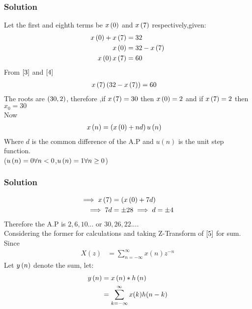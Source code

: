 \documentclass{beamer}
\begin{document}
\begin{frame}
\frametitle{Solution}
Let the first and eighth terms be $x\left(0\right)$ and $x\left(7\right)$ respectively,given:
\begin{align}
x\left(0\right)+x\left(7\right) &= 32\\
x\left(0\right) &= 32 - x\left(7\right)\label{3} \\
x\left(0\right)x\left(7\right) &= 60 \label{4}
\end{align}
From $\eqref{3}$ and $\eqref{4}$
\begin{align}
    x\left(7\right)\left(32-x\left(7\right)\right) &= 60
\end{align}
The roots are $\left(30,2\right)$, therefore ,if $x\left(7\right)=30$ then $x\left(0\right)=2$ and if $x\left(7\right)=2$ then $x_0=30$\\
Now
\begin{align}
    x\left(n\right) &= \left(x\left(0\right) + nd\right)u\left(n\right)\label{5}
    \end{align}
    Where $d$ is the common difference of the A.P and $u(n)$ is the unit step function.\\($u\left(n\right)=0 \forall n<0$,$u\left(n\right)=1 \forall n\geq0$)
\end{frame}






\begin{frame}
\frametitle{Solution}
\begin{align}
        \implies     x\left(7\right) &= \left(x\left(0\right) + 7d\right)\\
    \implies 7d &= \pm 28 \implies d = \pm 4
\end{align}
Therefore the A.P is $2,6,10...$ or $30,26,22...$.\\
Considering the former for calculations and taking Z-Transform of $\eqref{5}$ for sum.\\
Since
\begin{align}
X(z) &= \sum_{n=-\infty}^{\infty} x(n)z^{-n} \label{6}
\end{align}
Let $y\left(n\right)$ denote the sum, let:
\begin{align}
    y\left(n\right) &= x\left(n\right) * h\left(n\right)\\
    &= \sum_{k=-\infty}^{\infty} x(k)h(n-k)
\end{align}    
\end{frame}
\end{document}
